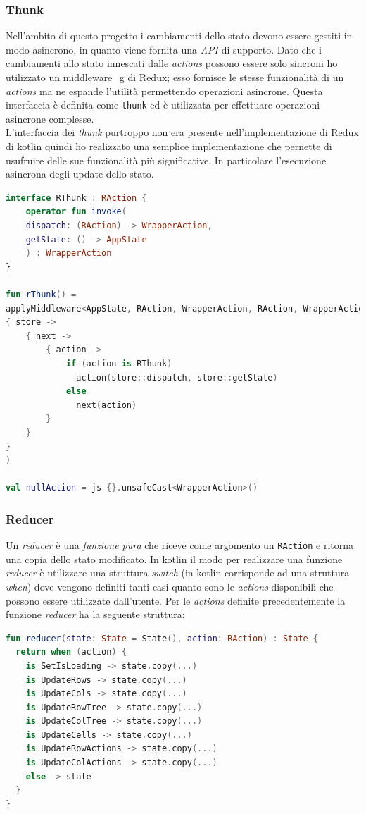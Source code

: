\subsubsection*{Thunk}
Nell'ambito di questo progetto i cambiamenti dello stato devono essere gestiti in modo asincrono, in quanto viene fornita una \emph{API} di supporto. Dato che i cambiamenti allo stato innescati dalle \emph{actions} possono essere solo sincroni ho utilizzato un \gls{middleware_g} di Redux; esso fornisce le stesse funzionalità di un \emph{actions} ma ne espande l'utilità permettendo operazioni asincrone. Questa interfaccia è definita come \verb|thunk| ed è utilizzata per effettuare operazioni asincrone complesse. \\
L'interfaccia dei \emph{thunk} purtroppo non era presente nell'implementazione di Redux di kotlin quindi ho realizzato una semplice implementazione che pernette di usufruire delle sue funzionalità più significative. In particolare l'esecuzione asincrona degli update dello stato.
\begin{lstlisting}[caption={Interfaccia Thunk}, label={lst:thunk_interface}, language=Kotlin]
interface RThunk : RAction {
	operator fun invoke(
	dispatch: (RAction) -> WrapperAction,
	getState: () -> AppState
	) : WrapperAction
}

fun rThunk() =
applyMiddleware<AppState, RAction, WrapperAction, RAction, WrapperAction>(
{ store ->
	{ next ->
		{ action ->
			if (action is RThunk)
			  action(store::dispatch, store::getState)
			else
			  next(action)
		}
	}
}
)

val nullAction = js {}.unsafeCast<WrapperAction>()
\end{lstlisting}

\subsubsection*{Reducer}
Un \emph{reducer} è una \emph{funzione pura} che riceve come argomento un \verb|RAction| e ritorna una copia dello stato modificato. In kotlin il modo per realizzare una funzione \emph{reducer} è utilizzare una struttura \emph{switch} (in kotlin corrisponde ad una struttura \emph{when}) dove vengono definiti tanti casi quanto sono le \emph{actions} disponibili che possono essere utilizzate dall'utente. Per le \emph{actions} definite precedentemente la funzione \emph{reducer} ha la seguente struttura:
\begin{lstlisting}[caption={Interfaccia Thunk}, label={lst:reducer_slice}, language=Kotlin]
fun reducer(state: State = State(), action: RAction) : State {
  return when (action) {
    is SetIsLoading -> state.copy(...)
    is UpdateRows -> state.copy(...)
    is UpdateCols -> state.copy(...)
    is UpdateRowTree -> state.copy(...)
    is UpdateColTree -> state.copy(...) 
    is UpdateCells -> state.copy(...)
    is UpdateRowActions -> state.copy(...)
    is UpdateColActions -> state.copy(...)
    else -> state
  }
}
\end{lstlisting}


